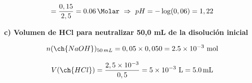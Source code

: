 \begin{exerciseEVAU}
\begin{solu}
        \begin{equation*}
            [\ch{H+}] = \dfrac{0,15}{2,5} = \SI{0.06}{\Molar} \ \Rightarrow \ pH = -\log(0,06) = 1,22
        \end{equation*}

        \textbf{c) Volumen de HCl para neutralizar 50,0 mL de la disolución inicial}

        \begin{equation*}
            n(\ch{NaOH})_{50\,mL} = 0,05 \times 0,050 = \num{2.5e-3} \ \text{mol}
        \end{equation*}

        \begin{equation*}
            V(\ch{HCl}) = \dfrac{2,5\times10^{-3}}{0,5} = \num{5e-3} \ \si{\litre} = \SI{5.0}{\milli\litre}
        \end{equation*}

    \end{solu}
\end{exerciseEVAU}

